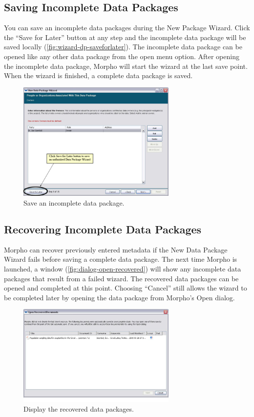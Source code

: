 \subsection{Saving Incomplete Data Packages} \label{sec:dp-saveforlater}

You can save an incomplete data packages during the New Package Wizard.
Click the ``Save for Later'' button at any step and the incomplete data
package will be saved locally (\autoref{fig:wizard-dp-saveforlater}).
The incomplete data package can be opened like any other data package
from the open menu option. After opening the incomplete data package,
Morpho will start the wizard at the last save point. When the wizard is
finished, a complete data package is saved.

\begin{figure}
  \centering
    \includegraphics[width=0.7\textwidth]{images/wizard-dp-saveforlater.jpg}
  \caption{Save an incomplete data package.}
  \label{fig:wizard-dp-saveforlater}
\end{figure}

\subsection{Recovering Incomplete Data Packages} \label{sec:dp-recover}

Morpho can recover previously entered metadata if the New Data Package
Wizard fails before saving a complete data package. The next time Morpho
is launched, a window (\autoref{fig:dialog-open-recovered}) will show any
incomplete data packages that result from a failed wizard. The recovered
data packages can be opened and completed at this point. Choosing
``Cancel'' still allows the wizard to be completed later by opening the
data package from Morpho’s Open dialog.

\begin{figure}
  \centering
    \includegraphics[width=0.7\textwidth]{images/dialog-open-recovered.jpg}
  \caption{Display the recovered data packages.}
  \label{fig:dialog-open-recovered}
\end{figure}
